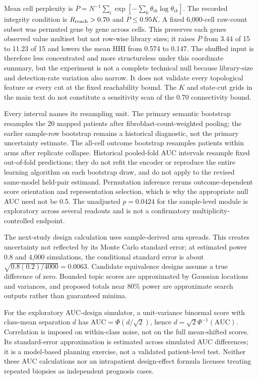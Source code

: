 Mean cell perplexity is $\overline P=N^{-1}\sum_i\exp[-\sum_k\theta_{ik}\log\theta_{ik}]$. The recorded integrity condition is $R_{\rm reach}>0.70$ and $\overline P\leq0.95K$. A fixed 6,000-cell raw-count subset was permuted gene by gene across cells. This preserves each gene\textquotesingle{}s observed value multiset but not row-wise library sizes; it raises $\overline P$ from 3.44 of 15 to 11.23 of 15 and lowers the mean HHI from 0.574 to 0.147. The shuffled input is therefore less concentrated and more structureless under this coordinate summary, but the experiment is not a complete technical null because library-size and detection-rate variation also narrow. It does not validate every topological feature or every cut at the fixed reachability bound. The $K$ and state-cut grids in the main text do not constitute a sensitivity scan of the 0.70 connectivity bound.

Every interval names its resampling unit. The primary semantic bootstrap resamples the 20 mapped patients after fibroblast-count-weighted pooling; the earlier sample-row bootstrap remains a historical diagnostic, not the primary uncertainty estimate. The all-cell outcome bootstrap resamples patients within arms after replicate collapse. Historical pooled-fold AUC intervals resample fixed out-of-fold predictions; they do not refit the encoder or reproduce the entire learning algorithm on each bootstrap draw, and do not apply to the revised same-model held-pair estimand. Permutation inference reruns outcome-dependent score orientation and representation selection, which is why the appropriate null AUC need not be 0.5. The unadjusted $p=0.0424$ for the sample-level module is exploratory across several readouts and is not a confirmatory multiplicity-controlled endpoint.

The next-study design calculation uses sample-derived arm spreads. This creates uncertainty not reflected by its Monte Carlo standard error; at estimated power 0.8 and 4,000 simulations, the conditional standard error is about $\sqrt{0.8(0.2)/4000}=0.0063$. Candidate equivalence designs assume a true difference of zero. Bounded topic scores are approximated by Gaussian locations and variances, and proposed totals near 80\% power are approximate search outputs rather than guaranteed minima.

For the exploratory AUC-design simulator, a unit-variance binormal score with class-mean separation $d$ has $\mathrm{AUC}=\Phi(d/\sqrt2)$, hence $d=\sqrt2\Phi^{-1}(\mathrm{AUC})$. Correlation is imposed on within-class noise, not on the full mean-shifted scores. Its standard-error approximation is estimated across simulated AUC differences; it is a model-based planning exercise, not a validated patient-level test. Neither these AUC calculations nor an intrapatient design-effect formula licenses treating repeated biopsies as independent prognosis cases.

